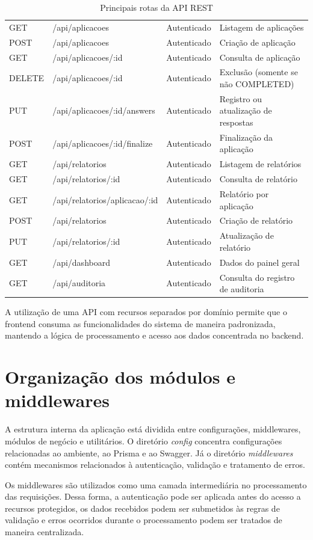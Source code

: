 \begin{table}[H]
\begin{tabular}{p{1.5cm} p{6cm} p{2.5cm} p{4.5cm}}
\hline
GET  & /api/aplicacoes & Autenticado & Listagem de aplicações \\
POST & /api/aplicacoes & Autenticado & Criação de aplicação \\
GET  & /api/aplicacoes/:id & Autenticado & Consulta de aplicação \\
DELETE & /api/aplicacoes/:id & Autenticado & Exclusão (somente se não COMPLETED) \\
PUT  & /api/aplicacoes/:id/answers & Autenticado & Registro ou atualização de respostas \\
POST & /api/aplicacoes/:id/finalize & Autenticado & Finalização da aplicação \\
\hline
GET  & /api/relatorios & Autenticado & Listagem de relatórios \\
GET  & /api/relatorios/:id & Autenticado & Consulta de relatório \\
GET  & /api/relatorios/aplicacao/:id & Autenticado & Relatório por aplicação \\
POST & /api/relatorios & Autenticado & Criação de relatório \\
PUT  & /api/relatorios/:id & Autenticado & Atualização de relatório \\
\hline
GET  & /api/dashboard & Autenticado & Dados do painel geral \\
GET  & /api/auditoria & Autenticado & Consulta do registro de auditoria \\
\hline
\end{tabular}
\caption{Principais rotas da API REST}
\label{tab:rotas_api}
\end{table}

A utilização de uma API com recursos separados por domínio permite que o frontend consuma as funcionalidades do sistema de maneira padronizada, mantendo a lógica de processamento e acesso aos dados concentrada no backend.

\section{Organização dos módulos e middlewares}

A estrutura interna da aplicação está dividida entre configurações, middlewares, módulos de negócio e utilitários. O diretório \textit{config} concentra configurações relacionadas ao ambiente, ao Prisma e ao Swagger. Já o diretório \textit{middlewares} contém mecanismos relacionados à autenticação, validação e tratamento de erros.

Os middlewares são utilizados como uma camada intermediária no processamento das requisições. Dessa forma, a autenticação pode ser aplicada antes do acesso a recursos protegidos, os dados recebidos podem ser submetidos às regras de validação e erros ocorridos durante o processamento podem ser tratados de maneira centralizada.

